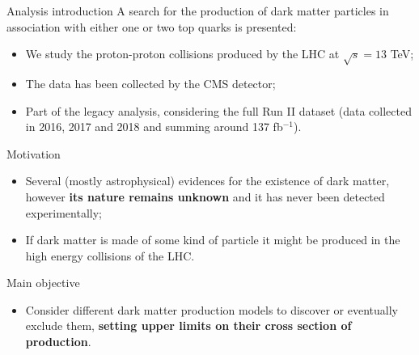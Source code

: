 \documentclass[8pt]{beamer}
\begin{document}
\begin{frame}{Analysis introduction}
\justifying
A search for the \alert{production of dark matter particles in association with either one or two top quarks} is presented:

\vspace{-5pt}
\begin{itemize}
\justifying
\item We study the proton-proton collisions produced by the LHC at $\sqrt{s} = 13$ TeV;
\item The data has been collected by the CMS detector;
\item Part of the legacy analysis, considering the full Run II dataset (data collected in 2016, 2017 and 2018 and summing around 137 fb$^{-1}$).
\end{itemize} \vfill

\begin{block}{\centering Motivation}\end{block}
\vspace{-5pt}
\begin{itemize}
\justifying
\item Several (mostly astrophysical) evidences for the existence of dark matter, however \textbf{its nature remains unknown} and it has never been detected experimentally;
\item If dark matter is made of some kind of particle it might be produced in the high energy collisions of the LHC.
\end{itemize} \vfill

\begin{block}{ \centering Main objective}\end{block}
\vspace{-5pt}
\begin{itemize}
\justifying
\item Consider different dark matter production models to discover or eventually exclude them, \textbf{setting upper limits on their cross section of production}.
\end{itemize} \vfill
\end{frame}
\end{document}
